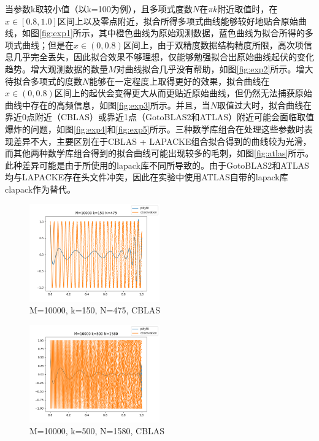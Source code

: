 \documentclass[a4paper]{article}
\begin{document}
当参数k取较小值（以k=100为例），且多项式度数$N$在$\pi k$附近取值时，在$x \in [0.8, 1.0]$区间上以及零点附近，拟合所得多项式曲线能够较好地贴合原始曲线，如图\ref{fig:exp1}所示，其中橙色曲线为原始观测数据，蓝色曲线为拟合所得的多项式曲线；但是在$x \in (0, 0.8)$区间上，由于双精度数据结构精度所限，高次项信息几乎完全丢失，因此拟合效果不够理想，仅能够勉强拟合出原始曲线起伏的变化趋势。增大观测数据的数量$M$对曲线拟合几乎没有帮助，如图\ref{fig:exp2}所示。增大待拟合多项式的度数$N$能够在一定程度上取得更好的效果，拟合曲线在$x \in (0, 0.8)$区间上的起伏会变得更大从而更贴近原始曲线，但仍然无法捕获原始曲线中存在的高频信息，如图\ref{fig:exp3}所示。并且，当$N$取值过大时，拟合曲线在靠近0点附近（CBLAS）或靠近1点（GotoBLAS2和ATLAS）附近可能会面临取值爆炸的问题，如图\ref{fig:exp4}和\ref{fig:exp5}所示。三种数学库组合在处理这些参数时表现差异不大，主要区别在于CBLAS + LAPACKE组合拟合得到的曲线较为光滑，而其他两种数学库组合得到的拟合曲线可能出现较多的毛刺，如图\ref{fig:atlas}所示。此种差异可能是由于所使用的lapack库不同所导致的。由于GotoBLAS2和ATLAS均与LAPACKE存在头文件冲突，因此在实验中使用ATLAS自带的lapack库clapack作为替代。

\begin{figure}[tbp]
  \centering
  \includegraphics[width=0.5\textwidth]{figures/lapack/figure18_M_10000_k_150_N_475.png}
  \caption{M=10000, k=150, N=475, CBLAS}
  \label{fig:exp6}
\end{figure}

\begin{figure}[tbp]
  \centering
  \includegraphics[width=0.5\textwidth]{figures/lapack/figure35_M_10000_k_500_N_1580.png}
  \caption{M=10000, k=500, N=1580, CBLAS}
  \label{fig:exp7}
\end{figure}
\end{document}
